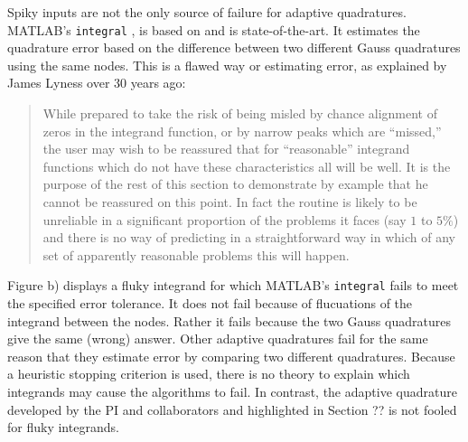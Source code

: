 \documentclass[11pt]{NSFamsart}
\begin{document}
Spiky inputs are not the only source of failure for adaptive quadratures. 
MATLAB's
\texttt{integral} \cite{MAT9.3}, is based on \cite{Sha08a} and is state-of-the-art.  It estimates the quadrature error based on the difference between two different Gauss quadratures using the same nodes. This is a flawed way or estimating error, as explained by James 
Lyness \cite[p.\ 69]{Lyn83} over 30 years ago:
\begin{quote}
	While prepared to take the risk of being misled by chance alignment of zeros in the integrand 
	function, or by narrow peaks which are ``missed,'' the user may wish to be reassured that for 
	``reasonable'' integrand functions which do not have these characteristics all will be well. It is the 
	purpose of the rest of this section to demonstrate by example that he cannot be reassured on this 
	point. In fact the routine is likely to be unreliable in a significant proportion of the problems it faces 
	(say $1$ to $5\%$) and there is no way of predicting in a straightforward way in which of any set 
	of apparently reasonable problems this will happen.
\end{quote}
Figure \label{quadfailfig}b) displays a fluky integrand for which MATLAB's \texttt{integral} fails to meet the specified error tolerance.  It does not fail because of flucuations of the integrand between the nodes.  Rather it fails because the two Gauss quadratures give the same (wrong) answer.  Other adaptive quadratures fail for the same reason that they estimate error by comparing two different quadratures.  Because a heuristic stopping criterion is used, there is no theory to explain which integrands may cause the algorithms to fail.  In contrast, the adaptive quadrature developed by the PI and collaborators \cite{HicEtal14b, Zha18a} and highlighted in Section ?? is not fooled for fluky integrands.
\end{document}
